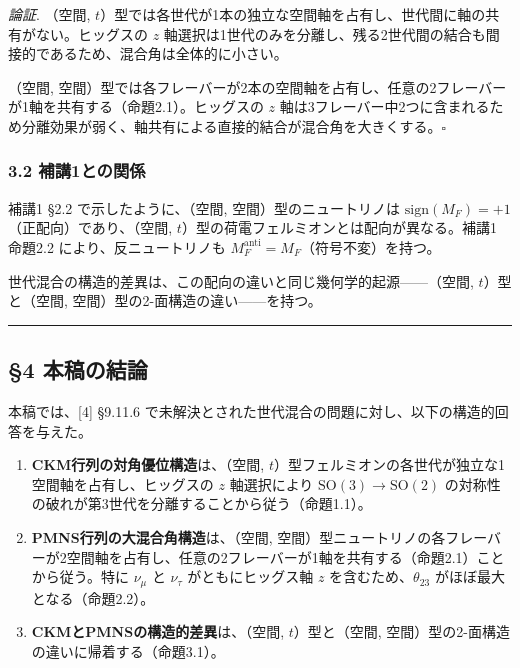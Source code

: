 \documentclass[
  a4paper,11pt]{ltjsarticle}
\begin{document}
\emph{論証}. （空間,
\(t\)）型では各世代が1本の独立な空間軸を占有し、世代間に軸の共有がない。ヒッグスの
\(z\)
軸選択は1世代のみを分離し、残る2世代間の結合も間接的であるため、混合角は全体的に小さい。

（空間,
空間）型では各フレーバーが2本の空間軸を占有し、任意の2フレーバーが1軸を共有する（命題2.1）。ヒッグスの
\(z\)
軸は3フレーバー中2つに含まれるため分離効果が弱く、軸共有による直接的結合が混合角を大きくする。\(\square\)

\subsubsection{3.2
補講1との関係}\label{ux88dcux8b1b1ux3068ux306eux95a2ux4fc2}

補講1 §2.2 で示したように、（空間, 空間）型のニュートリノは
\(\text{sign}(M_F) = +1\)（正配向）であり、（空間,
\(t\)）型の荷電フェルミオンとは配向が異なる。補講1 命題2.2
により、反ニュートリノも \(M_F^{\text{anti}} = M_F\)（符号不変）を持つ。

世代混合の構造的差異は、この配向の違いと同じ幾何学的起源------（空間,
\(t\)）型と（空間, 空間）型の2-面構造の違い------を持つ。

\begin{center}\rule{0.5\linewidth}{0.5pt}\end{center}

\subsection{§4 本稿の結論}\label{ux672cux7a3fux306eux7d50ux8ad6}

本稿では、{[}4{]} §9.11.6
で未解決とされた世代混合の問題に対し、以下の構造的回答を与えた。

\begin{enumerate}
\def\labelenumi{\arabic{enumi}.}
\item
  \textbf{CKM行列の対角優位構造}は、（空間,
  \(t\)）型フェルミオンの各世代が独立な1空間軸を占有し、ヒッグスの \(z\)
  軸選択により \(\mathrm{SO}(3) \to \mathrm{SO}(2)\)
  の対称性の破れが第3世代を分離することから従う（命題1.1）。
\item
  \textbf{PMNS行列の大混合角構造}は、（空間,
  空間）型ニュートリノの各フレーバーが2空間軸を占有し、任意の2フレーバーが1軸を共有する（命題2.1）ことから従う。特に
  \(\nu_\mu\) と \(\nu_\tau\) がともにヒッグス軸 \(z\)
  を含むため、\(\theta_{23}\) がほぼ最大となる（命題2.2）。
\item
  \textbf{CKMとPMNSの構造的差異}は、（空間, \(t\)）型と（空間,
  空間）型の2-面構造の違いに帰着する（命題3.1）。
\end{enumerate}
\end{document}
